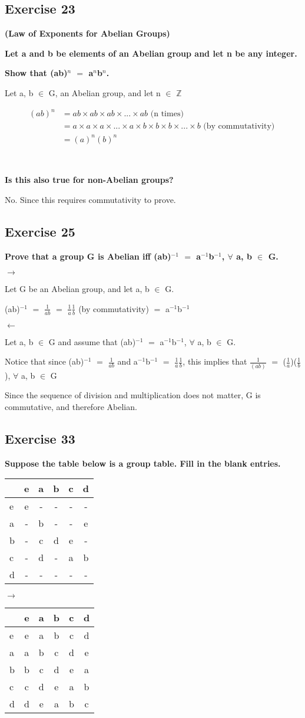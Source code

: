 \documentclass{article}
\newcommand{\mt}[1]{\ensuremath{#1}}
\newcommand\ssc[2][\DefaultOpt]{%
  \def\DefaultOpt{#2}%
  \subsection[#1]{#2}%
}
\newcommand{\bz}{\mt{\mathbb{Z}} }       %
\newcommand{\fa}{\mt{\forall} }          %
\newcommand{\mem}{\mt{\in} }
\newcommand{\lra}{ \mt{\longrightarrow} } %
\newcommand{\lla}{ \mt{\longleftarrow} }  %
\newcommand{\eql}{\mt{=} }
\newcommand{\uf}[2]{#1\mt{^{#2}}}
\newcommand{\frc}[2]{\mt{\frac{#1}{#2}}}
\newcommand{\eqn}[1]{\[#1\]}
\newcommand{\splt}[1]{\begin{split}#1\end{split}}
\begin{document}
\ssc{Exercise 23}{

\textbf{(Law of Exponents for Abelian Groups)}

\textbf{Let a and b be elements of an Abelian group and let n be any integer.}

\textbf{Show that \uf{(ab)}{n} \eql \uf{a}{n}\uf{b}{n}.}

Let a, b \mem G, an Abelian group, and let n \mem \bz

\eqn{
	\splt{
		(ab)^n & = ab \times  ab \times ab \times... \times ab \textrm{ (n times) } \\
		& = a \times a \times a \times ... \times a \times b \times b \times b \times ... \times b \textrm{ (by commutativity) } \\
		& = (a)^n(b)^n
	}
}

\

\textbf{Is this also true for non-Abelian groups?}

No. Since this requires commutativity to prove.
}

\ssc{Exercise 25}{

\textbf{Prove that a group G is Abelian iff \uf{(ab)}{-1} \eql \uf{a}{-1}\uf{b}{-1}, \fa a, b \mem G.}

\lra

Let G be an Abelian group, and let a, b \mem G.

\uf{(ab)}{-1} \eql \frc{1}{ab} \eql \frc{1}{a}\frc{1}{b} (by commutativity) \eql \uf{a}{-1}\uf{b}{-1} 

\lla

Let a, b \mem G and assume that \uf{(ab)}{-1} \eql \uf{a}{-1}\uf{b}{-1}, \fa a, b \mem G.

Notice that since \uf{(ab)}{-1} \eql \frc{1}{ab} and \uf{a}{-1}\uf{b}{-1} \eql \frc{1}{a}\frc{1}{b}, this implies that \frc{1}{(ab)} \eql (\frc{1}{a})(\frc{1}{b}), \fa a, b \mem G

Since the sequence of division and multiplication does not matter, G is commutative, and therefore Abelian.

}

\ssc{Exercise 33}{

\textbf{Suppose the table below is a group table. Fill in the blank entries.}

\begin{tabular}{l|ccccc}
  & e & a & b & c & d \\
  \hline
  e & e & - & - & - & - \\
  a & - & b & - & - & e \\
  b & - & c & d & e & -  \\
  c & - & d & - & a & b \\
  d & - & - & - & - & - 
\end{tabular}
\lra 
\begin{tabular}{l|ccccc}
  & e & a & b & c & d \\
  \hline
  e & e & a & b & c & d \\
  a & a & b & c & d & e \\
  b & b & c & d & e & a  \\
  c & c & d & e & a & b \\
  d & d & e & a & b & c 
\end{tabular}

}
\end{document}
